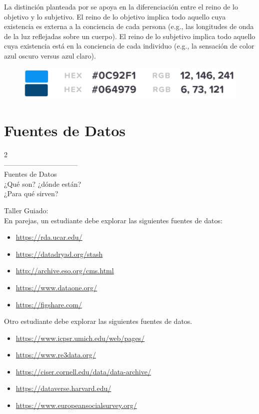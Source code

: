 \documentclass[aspectratio=169]{beamer}
\begin{document}
\begin{frame}
La distinción planteada por \citeauthor{Zins2007} \citeyear{Zins2007} se apoya en la diferenciación entre el reino de lo objetivo y lo subjetivo.  El reino de lo objetivo implica todo aquello cuya existencia es externa a la conciencia de cada persona (e.g., las longitudes de onda de la luz reflejadas sobre un cuerpo). El reino de lo subjetivo implica todo aquello cuya existencia está en la conciencia de cada individuo (e.g., la sensación de color azul oscuro versus azul claro).
\begin{figure}
\centering
 \includegraphics[width=.8\textwidth]{colores.png}
\end{figure}
\end{frame}


\section{Fuentes de Datos}
\begin{frame}
\begin{center}
\Huge
\textcolor{azulcesaclaro}{2\\
--------------------------------\\
Fuentes de Datos\\
¿Qué son? ¿dónde están?\\
¿Para qué sirven?}
\end{center}
\end{frame}

\begin{frame}
Taller Guiado:\\
En parejas, un estudiante debe explorar las siguientes fuentes de datos:
\begin{itemize}
    \item \url{https://rda.ucar.edu/}
    \item \url{https://datadryad.org/stash}
    \item \url{http://archive.eso.org/cms.html}
    \item \url{https://www.dataone.org/}
    \item \url{https://figshare.com/}
\end{itemize}
Otro estudiante debe explorar las siguientes fuentes de datos.
\begin{itemize}
    \item \url{https://www.icpsr.umich.edu/web/pages/}
    \item \url{https://www.re3data.org/}
    \item \url{https://ciser.cornell.edu/data/data-archive/}
    \item \url{https://dataverse.harvard.edu/}
    \item \url{https://www.europeansocialsurvey.org/}
\end{itemize}
\end{frame}
\end{document}
